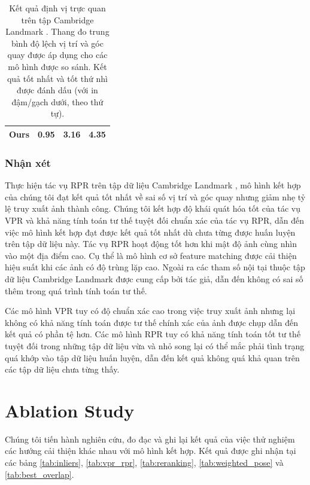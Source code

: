 \begin{table}
\begin{tabular}{|l|c|c|c|}
        Ours                                   & 0.95                                                                & \textbf{3.16}                                                            & \textbf{4.35}                                                                 \\ \hline
    \end{tabular}
    \vspace{10pt}
    \caption[Kết quả định vị trực quan trên tập Cambridge Landmark]{Kết quả định vị trực quan trên tập Cambridge Landmark \cite{kendall2016posenet}. Thang đo trung bình độ lệch vị trí và góc quay được áp dụng cho các mô hình được so sánh. Kết quả tốt nhất và tốt thứ nhì được đánh dấu (với in đậm/gạch dưới, theo thứ tự).}
    \label{tab:cambridge_vpr_comparison}
\end{table}
\egroup

\subsubsection*{Nhận xét}
Thực hiện tác vụ RPR trên tập dữ liệu Cambridge Landmark \cite{kendall2016posenet}, mô hình kết hợp của chúng tôi đạt kết quả tốt nhất về sai số vị trí và góc quay nhưng giảm nhẹ tỷ lệ truy xuất ảnh thành công. Chúng tôi kết hợp độ khái quát hóa tốt của tác vụ VPR và khả năng tính toán tư thế tuyệt đối chuẩn xác của tác vụ RPR, dẫn đến việc mô hình kết hợp đạt được kết quả tốt nhất dù chưa từng được huấn luyện trên tập dữ liệu này. Tác vụ RPR hoạt động tốt hơn khi mật độ ảnh cùng nhìn vào một địa điểm cao. Cụ thể là mô hình cơ sở feature matching được cải thiện hiệu suất khi các ảnh có độ trùng lặp cao. Ngoài ra các tham số nội tại thuộc tập dữ liệu Cambridge Landmark được cung cấp bởi tác giả, dẫn đến không có sai số thêm trong quá trình tính toán tư thế.

Các mô hình VPR tuy có độ chuẩn xác cao trong việc truy xuất ảnh nhưng lại không có khả năng tính toán được tư thế chính xác của ảnh được chụp dẫn đến kết quả có phần tệ hơn. Các mô hình RPR tuy có khả năng tính toán tốt tư thế tuyệt đối trong những tập dữ liệu vừa và nhỏ song lại có thể mắc phải tình trạng quá khớp vào tập dữ liệu huấn luyện, dẫn đến kết quả không quá khả quan trên các tập dữ liệu chưa từng thấy.

\section{Ablation Study}
Chúng tôi tiến hành nghiên cứu, đo đạc và ghi lại kết quả của việc thử nghiệm các hướng cải thiện khác nhau với mô hình kết hợp. Kết quả được ghi nhận tại các bảng \ref{tab:inliers}, \ref{tab:vpr_rpr}, \ref{tab:reranking}, \ref{tab:weighted_pose} và \ref{tab:best_overlap}.

